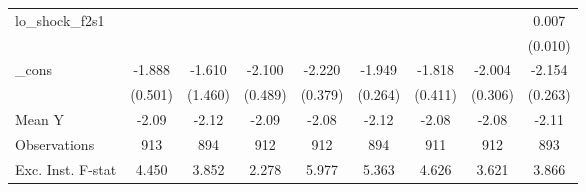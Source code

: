 {\begin{tabular}{l*{8}{c}}
\addlinespace
lo\_shock\_f2s1&                     &                     &                     &                     &                     &                     &                     &       0.007         \\
            &                     &                     &                     &                     &                     &                     &                     &     (0.010)         \\
\addlinespace
\_cons      &      -1.888\sym{***}&      -1.610         &      -2.100\sym{***}&      -2.220\sym{***}&      -1.949\sym{***}&      -1.818\sym{***}&      -2.004\sym{***}&      -2.154\sym{***}\\
            &     (0.501)         &     (1.460)         &     (0.489)         &     (0.379)         &     (0.264)         &     (0.411)         &     (0.306)         &     (0.263)         \\
\midrule
Mean Y      &       -2.09         &       -2.12         &       -2.09         &       -2.08         &       -2.12         &       -2.08         &       -2.08         &       -2.11         \\
Observations&         913         &         894         &         912         &         912         &         894         &         911         &         912         &         893         \\
Exc. Inst. F-stat&       4.450         &       3.852         &       2.278         &       5.977         &       5.363         &       4.626         &       3.621         &       3.866         \\
\bottomrule
\end{tabular}
}
